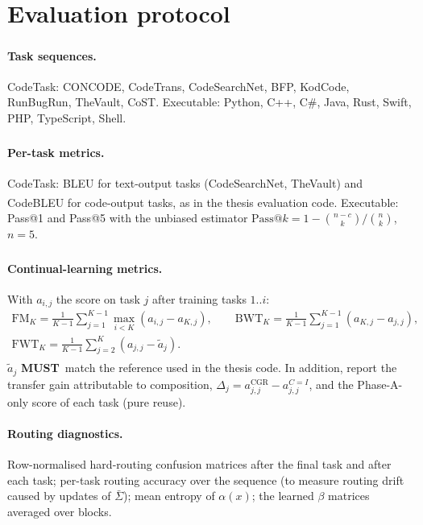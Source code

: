 \documentclass[11pt]{article}
\newcommand{\tagthesis}{\textsuperscript{\textcolor{teal!70!black}{\sffamily[thesis]}}}
\newcommand{\tagassumed}{\textsuperscript{\textcolor{red!70!black}{\sffamily[assumed]}}}
\newcommand{\MUST}{\textbf{MUST}}
\begin{document}
\section{Evaluation protocol}\label{sec:eval}

\paragraph{Task sequences\tagthesis.} CodeTask: CONCODE, CodeTrans, CodeSearchNet, BFP, KodCode, RunBugRun,
TheVault, CoST. Executable: Python, C++, C\#, Java, Rust, Swift, PHP, TypeScript, Shell.

\paragraph{Per-task metrics\tagthesis.} CodeTask: BLEU for text-output tasks (CodeSearchNet, TheVault) and
CodeBLEU for code-output tasks, as in the thesis evaluation code\tagassumed. Executable: Pass@1 and Pass@5 with the
unbiased estimator $\mathrm{Pass}@k=1-\binom{n-c}{k}/\binom{n}{k}$, $n=5$.

\paragraph{Continual-learning metrics\tagthesis.} With $a_{i,j}$ the score on task $j$ after training tasks
$1..i$:
\begin{gather}
  \mathrm{FM}_K=\frac{1}{K-1}\sum_{j=1}^{K-1}\max_{i<K}(a_{i,j}-a_{K,j}),\qquad
  \mathrm{BWT}_K=\frac{1}{K-1}\sum_{j=1}^{K-1}(a_{K,j}-a_{j,j}),\\
  \mathrm{FWT}_K=\frac{1}{K-1}\sum_{j=2}^{K}(a_{j,j}-\tilde a_j).
\end{gather}
$\tilde a_j$ \MUST\ match the reference used in the thesis code\tagassumed. In addition, report the transfer gain
attributable to composition, $\Delta_j=a_{j,j}^{\mathrm{CGR}}-a_{j,j}^{C=I}$, and the Phase-A-only score of each
task (pure reuse).

\paragraph{Routing diagnostics.} Row-normalised hard-routing confusion matrices after the final task and after
each task; per-task routing accuracy over the sequence (to measure routing drift caused by updates of $\bar\Sigma$);
mean entropy of $\alpha(x)$; the learned $\beta$ matrices averaged over blocks.
\end{document}
